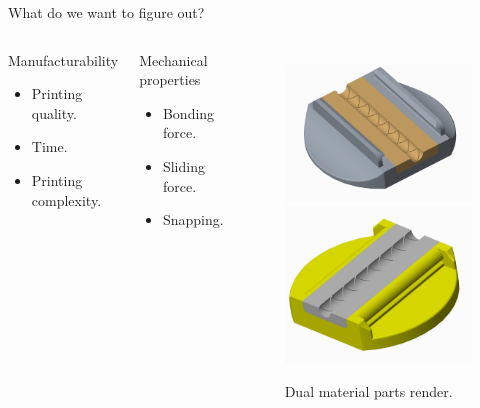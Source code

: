 \documentclass[10pt]{beamer} %
\begin{document}
\begin{frame}[fragile]{What do we want to figure out?}	
\begin{columns}[T,onlytextwidth]
\begin{block}{Manufacturability}
\begin{itemize}
\item Printing quality.
\item Time.
\item Printing complexity.
\end{itemize}
\end{block}
\begin{block}{Mechanical properties}
\begin{itemize}
\item Bonding force.
\item Sliding force.
\item Snapping.
\end{itemize}
\end{block}
\begin{figure}
\includegraphics[scale=0.04]{chesttube_top}
\includegraphics[scale=0.04]{chesttube_base}
\caption{Dual material parts render.}
\end{figure}
\end{columns}
\end{frame}
\end{document}
